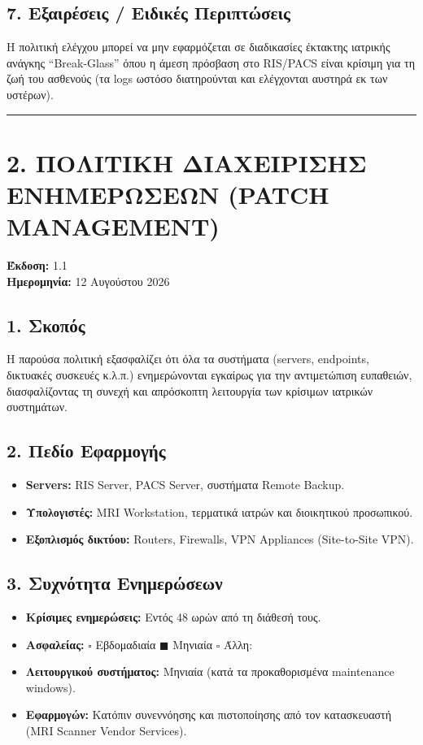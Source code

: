 \documentclass[11pt,a4paper]{article}
\begin{document}
\subsection*{7. Εξαιρέσεις / Ειδικές Περιπτώσεις}
Η πολιτική ελέγχου μπορεί να μην εφαρμόζεται σε διαδικασίες έκτακτης ιατρικής ανάγκης ``Break-Glass'' όπου η άμεση πρόσβαση στο RIS/PACS είναι κρίσιμη για τη ζωή του ασθενούς (τα logs ωστόσο διατηρούνται και ελέγχονται αυστηρά εκ των υστέρων).

\vspace{1cm}
\hrule
\vspace{1cm}

\section*{2. ΠΟΛΙΤΙΚΗ ΔΙΑΧΕΙΡΙΣΗΣ ΕΝΗΜΕΡΩΣΕΩΝ (PATCH MANAGEMENT)}
\textbf{Έκδοση:} 1.1\\
\textbf{Ημερομηνία:} 12 Αυγούστου 2026

\subsection*{1. Σκοπός}
Η παρούσα πολιτική εξασφαλίζει ότι όλα τα συστήματα (servers, endpoints, δικτυακές συσκευές κ.λ.π.) ενημερώνονται εγκαίρως για την αντιμετώπιση ευπαθειών, διασφαλίζοντας τη συνεχή και απρόσκοπτη λειτουργία των κρίσιμων ιατρικών συστημάτων.

\subsection*{2. Πεδίο Εφαρμογής}
\begin{itemize}
    \item \textbf{Servers:} RIS Server, PACS Server, συστήματα Remote Backup.
    \item \textbf{Υπολογιστές:} MRI Workstation, τερματικά ιατρών και διοικητικού προσωπικού.
    \item \textbf{Εξοπλισμός δικτύου:} Routers, Firewalls, VPN Appliances (Site-to-Site VPN).
\end{itemize}

\subsection*{3. Συχνότητα Ενημερώσεων}
\begin{itemize}
    \item \textbf{Κρίσιμες ενημερώσεις:} Εντός 48 ωρών από τη διάθεσή τους.
    \item \textbf{Ασφαλείας:} $\square$ Εβδομαδιαία \quad $\blacksquare$ Μηνιαία \quad $\square$ Άλλη:
    \item \textbf{Λειτουργικού συστήματος:} Μηνιαία (κατά τα προκαθορισμένα maintenance windows).
    \item \textbf{Εφαρμογών:} Κατόπιν συνεννόησης και πιστοποίησης από τον κατασκευαστή (MRI Scanner Vendor Services).
\end{itemize}
\end{document}
